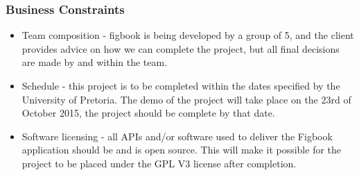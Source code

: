 \subsubsection{Business Constraints}
\begin{itemize}
\item Team composition - figbook is being developed by a group of 5, and the client provides advice on how we can complete the project, but all final decisions are made by and within the team.
\item Schedule - this project is to be completed within the dates specified by the University of Pretoria. The demo of the project will take place on the 23rd of October 2015, the project should be complete by that date.
\item Software licensing - all APIs and/or software used to deliver the Figbook application should be and is open source. This will make it possible for the project to be placed under the GPL V3 license after completion.
\end{itemize}



